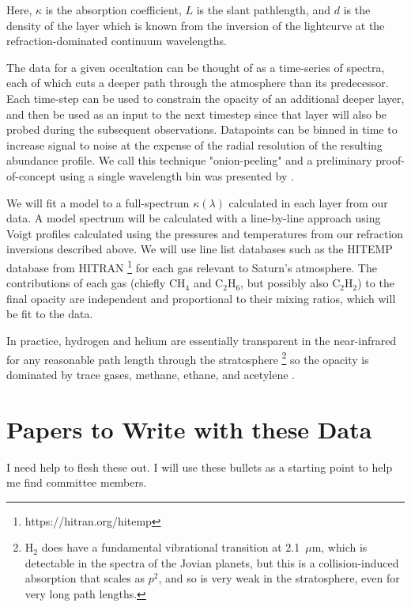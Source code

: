 \documentclass[12pt]{article}
\begin{document}
\noindent Here, $\kappa$ is the absorption coefficient, $L$ is the slant
pathlength, and $d$ is the density of the layer which is known from the
inversion of the lightcurve at the refraction-dominated continuum wavelengths.

The data for a given occultation can be thought of as a time-series of spectra,
each of which cuts a deeper path through the atmosphere than its predecessor.
Each time-step can be used to constrain the opacity of an additional deeper
layer, and then be used as an input to the next timestep since that layer will
also be probed during the subsequent observations. Datapoints can be binned in
time to increase signal to noise at the expense of the radial resolution of the
resulting abundance profile. We call this technique "onion-peeling" and a
preliminary proof-of-concept using a single wavelength bin was presented by
\cite{Banfield11}.

We will fit a model to a full-spectrum $\kappa(\lambda)$ calculated in each
layer from our data. A model spectrum will be calculated with a line-by-line
approach using Voigt profiles calculated using the pressures and temperatures
from our refraction inversions described above.  We will use line list
databases such as the HITEMP database from HITRAN
\footnote{https://hitran.org/hitemp} \citep{Gordon17b} for each gas relevant to
Saturn's atmosphere. The contributions of each gas (chiefly CH$_4$ and
C$_2$H$_6$, but possibly also C$_2$H$_2$) to the final opacity are independent
and proportional to their mixing ratios, which will be fit to the data.

In practice, hydrogen and helium are essentially transparent in the
near-infrared for any reasonable path length through the stratosphere
\footnote{H$_2$ does have a fundamental vibrational transition at 2.1~$\mu$m,
which is detectable in the spectra of the Jovian planets, but this is a
collision-induced absorption that scales as  $p^2$, and so is very weak in the
stratosphere, even for very long path lengths.}  so the opacity is dominated by
trace gases, methane, ethane, and acetylene \citep{Moses05}.

\section{Papers to Write with these Data}

I need help to flesh these out. I will use these bullets as a starting point to
help me find committee members.
\end{document}
